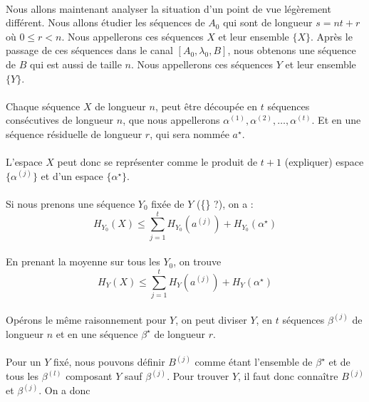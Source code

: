 	\paragraph{}
	Nous allons maintenant analyser la situation d'un point de vue 
	légèrement différent. Nous allons étudier les séquences de $A_0$ qui sont
	de longueur $s = nt+r$ où $0\le r < n$. Nous appellerons ces séquences 
	$X$ et leur ensemble $\{X\}$. Après le passage de ces séquences dans le 
	canal $[A_0,\lambda_0,B]$, nous obtenons une séquence de $B$ qui est aussi
	de taille $n$. Nous appellerons ces séquences $Y$ et 
	leur ensemble $\{Y\}$.
	
	\paragraph{}
	Chaque séquence $X$ de longueur $n$, peut être découpée en $t$ séquences 
	consécutives de longueur $n$, que nous appellerons 
	$\alpha^{(1)}, \alpha^{(2)}, \dots, \alpha^{(t)}$.
	Et en une séquence résiduelle de longueur $r$, qui sera nommée $a^\star$.
	
	\paragraph{}
	L'espace ${X}$ peut donc se représenter comme le produit de $t+1$ 
	(expliquer) espace $\{\alpha^{(j)}\}$ et d'un espace 
	$\{\alpha^\star\}$.
	
	\paragraph{}
	Si nous prenons une séquence $Y_0$ fixée de $Y$ (\{\} ?), on a :
	\[
		H_{Y_0}(X)\le 
		\sum_{j=1}^tH_{Y_0}\left(a^{(j)}\right)+H_{Y_0}(\alpha^\star)
	\]
	
	\paragraph{}
	En prenant la moyenne sur tous les $Y_0$, on trouve
	\[H_Y(X)\le \sum_{j=1}^tH_Y\left(a^{(j)}\right)+H_Y(\alpha^\star)\]
	
	\paragraph{}
	Opérons le même raisonnement pour $Y$, on peut diviser $Y$, en $t$ 
	séquences $\beta^{(j)}$ de longueur $n$ et en une séquence ${\beta^\star}$
	de longueur $r$. 
	
	\paragraph{}
	Pour un $Y$ fixé, nous pouvons définir $B^{(j)}$ comme étant l'ensemble de
	$\beta^\star$ et de tous les $\beta^{(l)}$ composant $Y$ sauf 
	$\beta^{(j)}$. Pour trouver $Y$, il faut donc connaître $B^{(j)}$ 
	et $\beta^{(j)}$. On a 	donc
	

